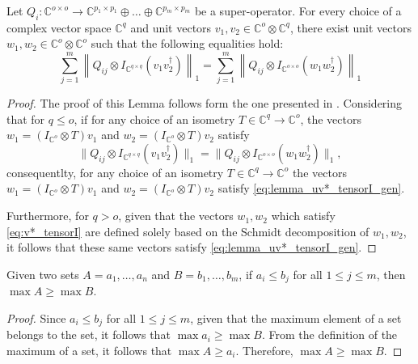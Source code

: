 \begin{lemma} \label{lemma:uv*_tensorI_gen}
  Let $Q_i: \mathbb{C}^{o \times o}  \rightarrow \mathbb{C}^{p_1 \times p_1} \oplus \ldots \oplus  \mathbb{C}^{p_m \times p_m}$ be a super-operator.  For every choice of a complex vector space $\mathbb{C}^{q}$ and unit vectors $v_1, v_2 \in \mathbb{C}^{o} \otimes \mathbb{C}^{q}$, there exist unit vectors $w_1, w_2 \in \mathbb{C}^{o} \otimes \mathbb{C}^{o}$ such that the following equalities hold:
  \begin{equation} \label{eq:lemma_uv*_tensorI_gen}
       \sum_{j=1}^{m} \left\lVert Q_{ij} \otimes I_{\mathbb{C}^{q \times q}} (v_1 v_2^\dag)\right\rVert_{1} = \sum_{j=1}^{m} \left\lVert Q_{ij}  \otimes I_{\mathbb{C}^{o \times o}} (w_1 w_2^\dag) \right\rVert_{1}
  \end{equation}
 \begin{proof}
  The proof of this Lemma follows form the one presented in \cite[Proof of Lemma 3.45]{watrous2018theory}. Considering that for $q \leq o$, if for any choice of an isometry $T \in \mathbb{C}^{q} \rightarrow \mathbb{C}^{o} $, the vectors $w_1 = (I_{\mathbb{C}^{o}} \otimes T)v_1$ and $w_2 = (I_{\mathbb{C}^{o}} \otimes T)v_2$  satisfy 
  \begin{equation} \label{eq:v*_tensorI}
    \lVert Q_{ij} \otimes I_{\mathbb{C}^{q \times q}} (v_1 v_2^\dag)\rVert_{1} = \lVert Q_{ij} \otimes I_{\mathbb{C}^{o \times o}} (w_1 w_2^\dag)\rVert_{1},
  \end{equation}
consequentlty, for any choice of an isometry $T \in \mathbb{C}^{q} \rightarrow \mathbb{C}^{o}$ the vectors $w_1 = (I_{\mathbb{C}^{o}} \otimes T)v_1$ and $w_2 = (I_{\mathbb{C}^{o}} \otimes T)v_2$  satisfy \autoref{eq:lemma_uv*_tensorI_gen}.

Furthermore, for $q > o$, given that the vectors $w_1, w_2$ which  satisfy \autoref{eq:v*_tensorI} are defined solely based on the Schmidt decomposition of $w_1, w_2$, it follows that these same vectors satisfy \autoref{eq:lemma_uv*_tensorI_gen}.
 \end{proof}

\end{lemma}


\begin{lemma} \label{lemma:max_sup_set}
  Given two sets $A = {a_1, \ldots, a_n}$ and $B = {b_1, \ldots, b_m}$, if $a_i \leq b_j$ for all $1 \leq j \leq m$, then $\max A \geq \max B$.
\end{lemma}
\begin{proof}
  Since $a_i \leq b_j$ for all $1 \leq j \leq m$, given that the maximum element of a set belongs to the set, it follows that $\max a_i \geq \max B$. From the definition of the maximum of a set, it follows that $\max A \geq a_i$. Therefore, $\max A \geq \max B$.
\end{proof}

